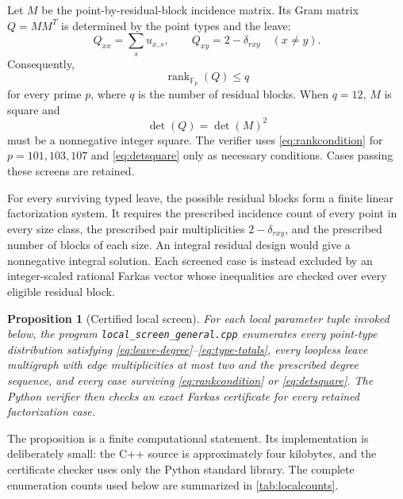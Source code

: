 \documentclass[11pt]{amsart}
\newtheorem{proposition}[theorem]{Proposition}
\DeclareMathOperator{\rank}{rank}
\begin{document}
Let $M$ be the point-by-residual-block incidence matrix. Its Gram matrix $Q=MM^T$ is determined by the point types and the leave:
\begin{equation}\label{eq:gram}
 Q_{xx}=\sum_su_{x,s},
 \qquad
 Q_{xy}=2-\delta_{rxy}\quad(x\ne y).
\end{equation}
Consequently,
\begin{equation}\label{eq:rankcondition}
  \rank_{\mathbb F_p}(Q)\le q
\end{equation}
for every prime $p$, where $q$ is the number of residual blocks. When $q=12$, $M$ is square and
\begin{equation}\label{eq:detsquare}
  \det(Q)=\det(M)^2
\end{equation}
must be a nonnegative integer square. The verifier uses \eqref{eq:rankcondition} for $p=101,103,107$ and \eqref{eq:detsquare} only as necessary conditions. Cases passing these screens are retained.

For every surviving typed leave, the possible residual blocks form a finite linear factorization system. It requires the prescribed incidence count of every point in every size class, the prescribed pair multiplicities $2-\delta_{rxy}$, and the prescribed number of blocks of each size. An integral residual design would give a nonnegative integral solution. Each screened case is instead excluded by an integer-scaled rational Farkas vector whose inequalities are checked over every eligible residual block.

\begin{proposition}[Certified local screen]\label{prop:localscreen}
For each local parameter tuple invoked below, the program \texttt{local\_screen\_general.cpp} enumerates every point-type distribution satisfying \eqref{eq:leave-degree}--\eqref{eq:type-totals}, every loopless leave multigraph with edge multiplicities at most two and the prescribed degree sequence, and every case surviving \eqref{eq:rankcondition} or \eqref{eq:detsquare}. The Python verifier then checks an exact Farkas certificate for every retained factorization case.
\end{proposition}

The proposition is a finite computational statement. Its implementation is deliberately small: the C++ source is approximately four kilobytes, and the certificate checker uses only the Python standard library. The complete enumeration counts used below are summarized in \cref{tab:localcounts}.
\end{document}
